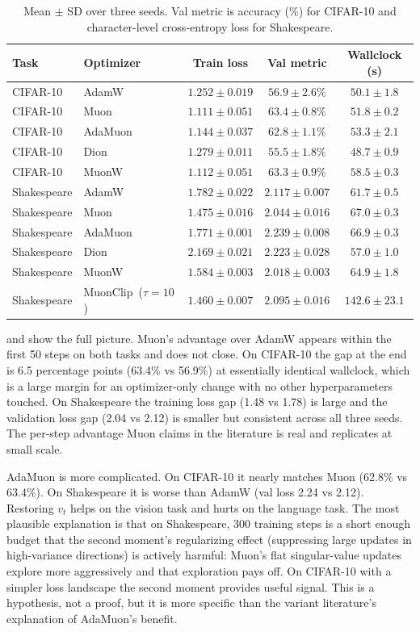 \begin{table}[h]
\centering\small
\renewcommand{\arraystretch}{1.05}
\begin{tabular}{llccc}
\toprule
Task & Optimizer & Train loss & Val metric & Wallclock (s) \\
\midrule
CIFAR-10 & AdamW   & $1.252\pm0.019$ & $56.9\pm2.6\%$ & $50.1\pm1.8$ \\
CIFAR-10 & Muon    & $1.111\pm0.051$ & $63.4\pm0.8\%$ & $51.8\pm0.2$ \\
CIFAR-10 & AdaMuon & $1.144\pm0.037$ & $62.8\pm1.1\%$ & $53.3\pm2.1$ \\
CIFAR-10 & Dion    & $1.279\pm0.011$ & $55.5\pm1.8\%$ & $48.7\pm0.9$ \\
CIFAR-10 & MuonW   & $1.112\pm0.051$ & $63.3\pm0.9\%$ & $58.5\pm0.3$ \\
\midrule
Shakespeare & AdamW             & $1.782\pm0.022$ & $2.117\pm0.007$ & $61.7\pm0.5$ \\
Shakespeare & Muon              & $1.475\pm0.016$ & $2.044\pm0.016$ & $67.0\pm0.3$ \\
Shakespeare & AdaMuon           & $1.771\pm0.001$ & $2.239\pm0.008$ & $66.9\pm0.3$ \\
Shakespeare & Dion              & $2.169\pm0.021$ & $2.223\pm0.028$ & $57.0\pm1.0$ \\
Shakespeare & MuonW             & $1.584\pm0.003$ & $2.018\pm0.003$ & $64.9\pm1.8$ \\
Shakespeare & MuonClip~($\tau{=}10$) & $1.460\pm0.007$ & $2.095\pm0.016$ & $142.6\pm23.1$ \\
\bottomrule
\end{tabular}
\caption{Mean $\pm$ SD over three seeds. Val metric is accuracy (\%) for CIFAR-10 and character-level cross-entropy loss for Shakespeare.}
\label{tab:results}
\end{table}

 and  show the full picture. Muon's advantage over AdamW appears within the first 50 steps on both tasks and does not close. On CIFAR-10 the gap at the end is 6.5 percentage points (63.4\% vs 56.9\%) at essentially identical wallclock, which is a large margin for an optimizer-only change with no other hyperparameters touched. On Shakespeare the training loss gap (1.48 vs 1.78) is large and the validation loss gap (2.04 vs 2.12) is smaller but consistent across all three seeds. The per-step advantage Muon claims in the literature is real and replicates at small scale.

AdaMuon is more complicated. On CIFAR-10 it nearly matches Muon (62.8\% vs 63.4\%). On Shakespeare it is worse than AdamW (val loss 2.24 vs 2.12). Restoring $v_t$ helps on the vision task and hurts on the language task. The most plausible explanation is that on Shakespeare, 300 training steps is a short enough budget that the second moment's regularizing effect (suppressing large updates in high-variance directions) is actively harmful: Muon's flat singular-value updates explore more aggressively and that exploration pays off. On CIFAR-10 with a simpler loss landscape the second moment provides useful signal. This is a hypothesis, not a proof, but it is more specific than the variant literature's explanation of AdaMuon's benefit.

